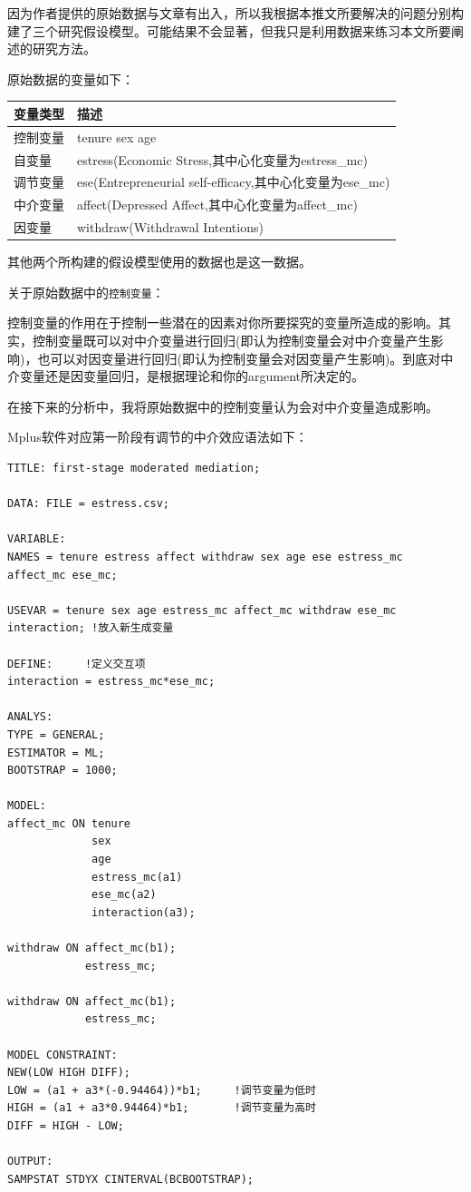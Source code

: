 \documentclass[
]{book}
\begin{document}
因为作者提供的原始数据与文章有出入，所以我根据本推文所要解决的问题分别构建了三个研究假设模型。可能结果不会显著，但我只是利用数据来练习本文所要阐述的研究方法。

原始数据的变量如下：

\begin{longtable}[]{@{}ll@{}}
\toprule
变量类型 & 描述\tabularnewline
\midrule
\endhead
控制变量 & tenure sex age\tabularnewline
自变量 & estress(Economic Stress,其中心化变量为estress\_mc)\tabularnewline
调节变量 & ese(Entrepreneurial self-efficacy,其中心化变量为ese\_mc)\tabularnewline
中介变量 & affect(Depressed Affect,其中心化变量为affect\_mc)\tabularnewline
因变量 & withdraw(Withdrawal Intentions)\tabularnewline
\bottomrule
\end{longtable}

其他两个所构建的假设模型使用的数据也是这一数据。

关于原始数据中的\texttt{控制变量}：

控制变量的作用在于控制一些潜在的因素对你所要探究的变量所造成的影响。其实，控制变量既可以对中介变量进行回归(即认为控制变量会对中介变量产生影响)，也可以对因变量进行回归(即认为控制变量会对因变量产生影响)。到底对中介变量还是因变量回归，是根据理论和你的argument所决定的。

在接下来的分析中，我将原始数据中的控制变量认为会对中介变量造成影响。

Mplus软件对应第一阶段有调节的中介效应语法如下：

\begin{verbatim}
TITLE: first-stage moderated mediation;

DATA: FILE = estress.csv;

VARIABLE:
NAMES = tenure estress affect withdraw sex age ese estress_mc affect_mc ese_mc;

USEVAR = tenure sex age estress_mc affect_mc withdraw ese_mc interaction; !放入新生成变量

DEFINE:     !定义交互项
interaction = estress_mc*ese_mc; 

ANALYS:
TYPE = GENERAL;
ESTIMATOR = ML;
BOOTSTRAP = 1000;

MODEL:
affect_mc ON tenure
             sex
             age
             estress_mc(a1)
             ese_mc(a2)
             interaction(a3);

withdraw ON affect_mc(b1);
            estress_mc;

withdraw ON affect_mc(b1);
            estress_mc;

MODEL CONSTRAINT:
NEW(LOW HIGH DIFF);
LOW = (a1 + a3*(-0.94464))*b1;     !调节变量为低时
HIGH = (a1 + a3*0.94464)*b1;       !调节变量为高时
DIFF = HIGH - LOW;

OUTPUT:
SAMPSTAT STDYX CINTERVAL(BCBOOTSTRAP);
\end{verbatim}
\end{document}
